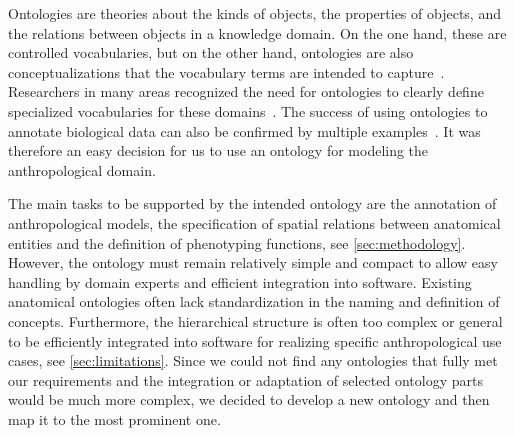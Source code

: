 \documentclass[sw]{iosart2x}
\begin{document}
Ontologies are theories about the kinds of objects, the properties of objects, and the relations between objects in a knowledge domain.
On the one hand, these are controlled vocabularies, but on the other hand, ontologies are also conceptualizations that the vocabulary terms are intended to capture~\citep{whatareontologies}.
Researchers in many areas recognized the need for ontologies to clearly define specialized vocabularies for these domains~\citep{evaluatingdomain}.
The success of using ontologies to annotate biological data can also be confirmed by multiple examples~\citep{biomedicalontologies}.
It was therefore an easy decision for us to use an ontology for modeling the anthropological domain.

The main tasks to be supported by the intended ontology are the annotation of anthropological models, the specification of spatial relations between anatomical entities and the definition of phenotyping functions, see \cref{sec:methodology}.
However, the ontology must remain relatively simple and compact to allow easy handling by domain experts and efficient integration into software.
Existing anatomical ontologies often lack standardization in the naming and definition of concepts.
Furthermore, the hierarchical structure is often too complex or general to be efficiently integrated into software for realizing specific anthropological use cases, see \cref{sec:limitations}.
Since we could not find any ontologies that fully met our requirements and the integration or adaptation of selected ontology parts would be much more complex, we decided to develop a new ontology and then map it to the most prominent one.
\end{document}
